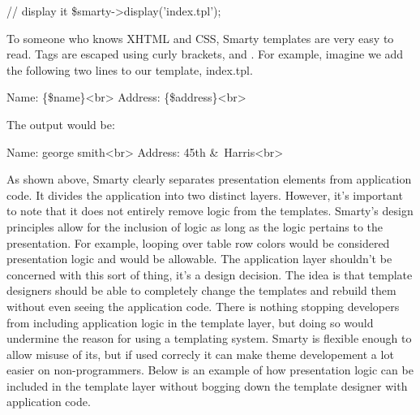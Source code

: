 \documentclass[a4paper,12pt]{report}
\begin{document}
// display it
\$smarty->display('index.tpl');


To someone who knows XHTML and CSS, Smarty templates are very easy to read. 
Tags are escaped using curly brackets, { and }. 
For example, imagine we add the following two lines to our template, index.tpl. 

Name: \{\$name\}<br>
Address: \{\$address\}<br>

The output would be:

Name: george smith<br>
Address: 45th \&\ Harris<br>

As shown above, Smarty clearly separates presentation elements from application code. 
It divides the application into two distinct layers. 
However, it's important to note that it does not entirely remove logic from the templates. 
Smarty's design principles allow for the inclusion of logic as long as the logic pertains to the presentation. 
For example, looping over table row colors would be considered presentation logic and would be allowable. 
The application layer shouldn't be concerned with this sort of thing, it's a design decision. 
The idea is that template designers should be able to completely change the templates and rebuild them without even seeing the application code.
There is nothing stopping developers from including application logic in the template layer, but doing so would undermine the reason for using a templating system. 
Smarty is flexible enough to allow misuse of its, but if used correcly it can make theme developement a lot easier on non-programmers. 
Below is an example of how presentation logic can be included in the template layer without bogging down the template designer with application code. 
\end{document}
